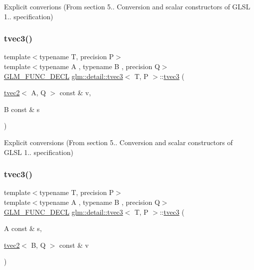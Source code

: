 Explicit converions (From section 5.. Conversion and scalar constructors of G\+L\+SL 1.. specification) 

\mbox{\label{structglm_1_1detail_1_1tvec3_aa267579f4071920b9908f7ec7779cfe1}} 
\subsubsection{\texorpdfstring{tvec3()}{tvec3()}\hspace{0.1cm}{\footnotesize\ttfamily [8/17]}}
{\footnotesize\ttfamily template$<$typename T, precision P$>$ \\
template$<$typename A , typename B , precision Q$>$ \\
\hyperlink{setup_8hpp_ab2d052de21a70539923e9bcbf6e83a51}{G\+L\+M\+\_\+\+F\+U\+N\+C\+\_\+\+D\+E\+CL} \hyperlink{structglm_1_1detail_1_1tvec3}{glm\+::detail\+::tvec3}$<$ T, P $>$\+::\hyperlink{structglm_1_1detail_1_1tvec3}{tvec3} (\begin{DoxyParamCaption}\item[{\hyperlink{structglm_1_1detail_1_1tvec2}{tvec2}$<$ A, Q $>$ const \&}]{v,  }\item[{B const \&}]{s }\end{DoxyParamCaption})\hspace{0.3cm}{\ttfamily [explicit]}}



Explicit conversions (From section 5.. Conversion and scalar constructors of G\+L\+SL 1.. specification) 

\mbox{\label{structglm_1_1detail_1_1tvec3_a0c479351c5b7c950e5470b8ed287997d}} 
\subsubsection{\texorpdfstring{tvec3()}{tvec3()}\hspace{0.1cm}{\footnotesize\ttfamily [9/17]}}
{\footnotesize\ttfamily template$<$typename T, precision P$>$ \\
template$<$typename A , typename B , precision Q$>$ \\
\hyperlink{setup_8hpp_ab2d052de21a70539923e9bcbf6e83a51}{G\+L\+M\+\_\+\+F\+U\+N\+C\+\_\+\+D\+E\+CL} \hyperlink{structglm_1_1detail_1_1tvec3}{glm\+::detail\+::tvec3}$<$ T, P $>$\+::\hyperlink{structglm_1_1detail_1_1tvec3}{tvec3} (\begin{DoxyParamCaption}\item[{A const \&}]{s,  }\item[{\hyperlink{structglm_1_1detail_1_1tvec2}{tvec2}$<$ B, Q $>$ const \&}]{v }\end{DoxyParamCaption})\hspace{0.3cm}{\ttfamily [explicit]}}




